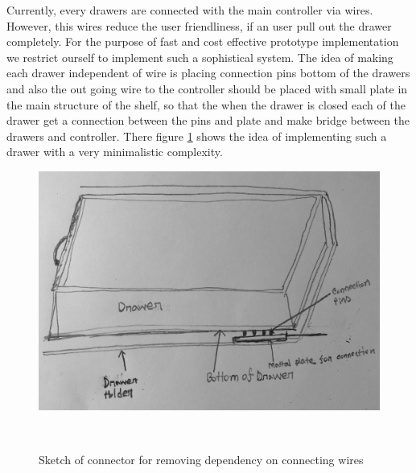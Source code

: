 Currently, every drawers are connected with the main controller via wires. However, this wires reduce the user friendliness, if an user pull out the drawer completely. For the purpose of fast and cost effective prototype implementation we restrict ourself to implement such a sophistical system. The idea of making each drawer independent of wire is placing connection pins bottom of the drawers and also the out going wire to the controller 
should be placed with small plate in the main structure of the shelf, so that the when the drawer is closed each of the drawer get a connection between the pins and plate and make bridge between the drawers and controller.
There figure \ref{fig:connector} shows the idea of implementing such a drawer with a very minimalistic complexity.
%
\begin{figure}
	\includegraphics[width=1\columnwidth]{figures/connector}
	\caption{Sketch of connector for removing dependency on connecting wires}~\label{fig:connector}
\end{figure}
%
\\
\\